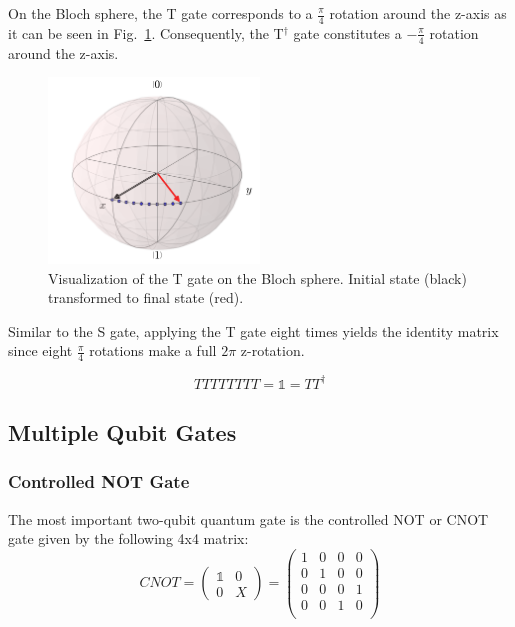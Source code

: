 On the Bloch sphere, the T gate corresponds to a $\frac{\pi}{4}$ rotation around the z-axis as it can be seen in Fig.~\ref{img:blochtgate}. Consequently, the T$^\dagger$ gate constitutes a $-\frac{\pi}{4}$ rotation around the z-axis.

\begin{figure}[ht]
   \centering
   \includegraphics[width=0.5\textwidth]{img/blochtgate.png}
   \caption{Visualization of the T gate on the Bloch sphere. Initial state (black) transformed to final state (red).}
   \label{img:blochtgate}
\end{figure}

Similar to the S gate, applying the T gate eight times yields the identity matrix since eight $\frac{\pi}{4}$ rotations make a full $2\pi$ z-rotation.

\begin{equation}
TTTTTTTT = \mathbb{1} = TT^\dagger
\end{equation}



\subsection{Multiple Qubit Gates}
\label{subsubsec:multiqubitgates}

\subsubsection{Controlled NOT Gate}
\label{subsubsubsec:cnotgate}

The most important two-qubit quantum gate is the controlled NOT or CNOT gate given by the following 4x4 matrix:
\begin{equation}
CNOT = \begin{pmatrix}
 \mathbb{1} & 0 \\ 
 0 & X
 \end{pmatrix} = \begin{pmatrix}
 1 & 0 & 0 & 0 \\ 
 0 & 1 & 0 & 0 \\
 0 & 0 & 0 & 1 \\
 0 & 0 & 1 & 0 \\
 \end{pmatrix}
\end{equation}

